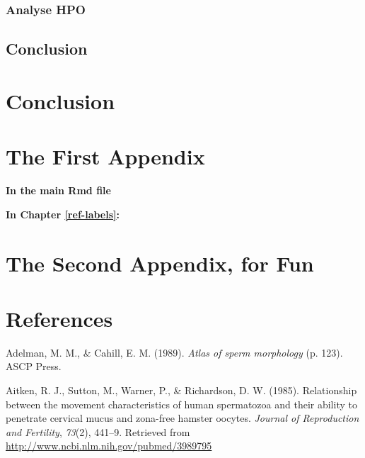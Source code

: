 \documentclass[12pt,twoside]{reedthesis}
\theoremstyle{definition}
\theoremstyle{definition}
\theoremstyle{remark}
\begin{document}
  \subsection{Analyse HPO}\label{analyse-hpo}
  
  \section{Conclusion}\label{conclusion}
  
  \chapter*{Conclusion}\label{conclusion-1}
  
  \appendix
  
  \chapter{The First Appendix}\label{the-first-appendix}
  
  \textbf{In the main Rmd file}
  
  \textbf{In Chapter \ref{ref-labels}:}
  
  \chapter{The Second Appendix, for
  Fun}\label{the-second-appendix-for-fun}
  
  \backmatter
  
  \chapter*{References}\label{references}
  
  \noindent
  
  \setlength{\parindent}{-0.20in} \setlength{\leftskip}{0.20in}
  \setlength{\parskip}{8pt}
  
  \hypertarget{refs}{}
  \hypertarget{ref-Adelman1989}{}
  Adelman, M. M., \& Cahill, E. M. (1989). \emph{Atlas of sperm
  morphology} (p. 123). ASCP Press.
  
  \hypertarget{ref-Aitken1985}{}
  Aitken, R. J., Sutton, M., Warner, P., \& Richardson, D. W. (1985).
  Relationship between the movement characteristics of human spermatozoa
  and their ability to penetrate cervical mucus and zona-free hamster
  oocytes. \emph{Journal of Reproduction and Fertility}, \emph{73}(2),
  441--9. Retrieved from \url{http://www.ncbi.nlm.nih.gov/pubmed/3989795}
  
\end{document}
